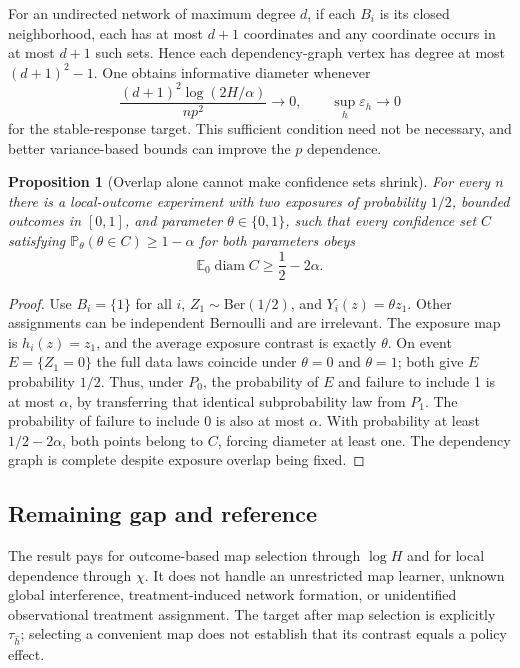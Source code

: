 \documentclass[11pt,a4paper]{article}
\newtheorem{proposition}[theorem]{Proposition}
\newcommand{\E}{\mathbb E}
\newcommand{\Prb}{\mathbb P}
\newcommand{\diam}{\operatorname{diam}}
\begin{document}
For an undirected network of maximum degree $d$, if each $B_i$ is its closed neighborhood, each has at most $d+1$ coordinates and any coordinate occurs in at most $d+1$ such sets. Hence each dependency-graph vertex has degree at most $(d+1)^2-1$. One obtains informative diameter whenever
\[
 \frac{(d+1)^2\log(2H/\alpha)}{np^2}\longrightarrow0,
 \qquad\sup_h\varepsilon_h\longrightarrow0
\]
for the stable-response target. This sufficient condition need not be necessary, and better variance-based bounds can improve the $p$ dependence.

\begin{proposition}[Overlap alone cannot make confidence sets shrink]
For every $n$ there is a local-outcome experiment with two exposures of probability $1/2$, bounded outcomes in $[0,1]$, and parameter $\theta\in\{0,1\}$, such that every confidence set $C$ satisfying $\Prb_\theta(\theta\in C)\geq1-\alpha$ for both parameters obeys
\[
 \E_0\diam C\geq\frac12-2\alpha.
\]
\end{proposition}
\begin{proof}
Use $B_i=\{1\}$ for all $i$, $Z_1\sim\mathrm{Ber}(1/2)$, and $Y_i(z)=\theta z_1$. Other assignments can be independent Bernoulli and are irrelevant. The exposure map is $h_i(z)=z_1$, and the average exposure contrast is exactly $\theta$. On event $E=\{Z_1=0\}$ the full data laws coincide under $\theta=0$ and $\theta=1$; both give $E$ probability $1/2$. Thus, under $P_0$, the probability of $E$ and failure to include 1 is at most $\alpha$, by transferring that identical subprobability law from $P_1$. The probability of failure to include 0 is also at most $\alpha$. With probability at least $1/2-2\alpha$, both points belong to $C$, forcing diameter at least one. The dependency graph is complete despite exposure overlap being fixed.
\end{proof}

\subsection*{Remaining gap and reference}
The result pays for outcome-based map selection through $\log H$ and for local dependence through $\chi$. It does not handle an unrestricted map learner, unknown global interference, treatment-induced network formation, or unidentified observational treatment assignment. The target after map selection is explicitly $\tau_{\widehat h}$; selecting a convenient map does not establish that its contrast equals a policy effect.
\end{document}
